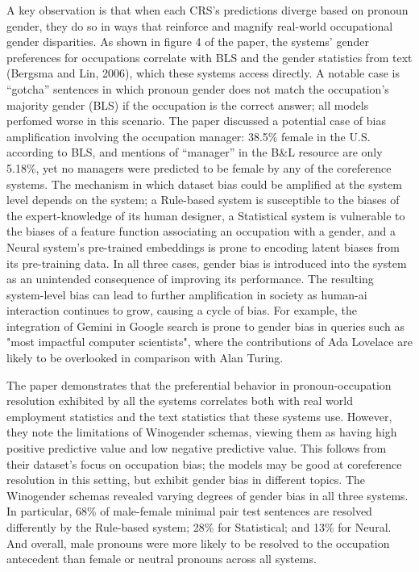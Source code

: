 \documentclass[11pt]{article}
\begin{document}
A key observation is that when each CRS's predictions diverge based
on pronoun gender, they do so in ways that reinforce and magnify real-world 
occupational gender disparities. As shown in figure 4 of the paper, the systems' gender
preferences for occupations correlate with BLS
and the gender statistics from text (Bergsma and Lin, 2006), which these systems access directly. 
A notable case is “gotcha” sentences in which pronoun gender does not match the occupation's 
majority gender (BLS) if the occupation is the correct answer; all models perfomed worse in this scenario. 
The paper discussed a potential case of bias amplification involving the occupation manager: 
38.5\% female in the U.S. according to BLS, and mentions of
“manager” in the B\&L resource are only 5.18\%, yet no managers 
were predicted to be female by any of the coreference systems.
The mechanism in which dataset bias could be amplified at the system level depends on the system;
a Rule-based system is susceptible to the biases of the expert-knowledge of its human designer,
a Statistical system is vulnerable to the biases of a feature function associating an occupation with a gender,
and a Neural system's pre-trained embeddings is prone to encoding latent biases from its pre-training data. In all three cases, gender bias is introduced into the system as an unintended consequence of improving
its performance. The resulting system-level bias can
lead to further amplification in society as human-ai interaction continues to grow, causing a cycle of bias. For example,
the integration of Gemini in Google search is prone to gender bias in queries such as "most impactful computer scientists", 
where the contributions of Ada Lovelace are likely to be overlooked in comparison with Alan Turing.

The paper demonstrates that the preferential behavior in pronoun-occupation resolution exhibited 
by all the systems correlates both with real world employment statistics and the text statistics
that these systems use. However, they note the limitations of
{Winogender schemas}, viewing them as having high positive predictive value and low negative predictive
value. This follows from their dataset's focus on occupation
bias; the models may be good at coreference resolution in this setting, but exhibit gender
bias in different topics. The Winogender schemas
revealed varying degrees of gender bias in all three
systems. In particular, 68\% of male-female minimal pair 
test sentences are resolved differently by the Rule-based 
system; 28\% for Statistical; and 13\% for Neural. And overall, male pronouns were more likely to
be resolved to the occupation antecedent than female or neutral pronouns across all systems.
\end{document}
